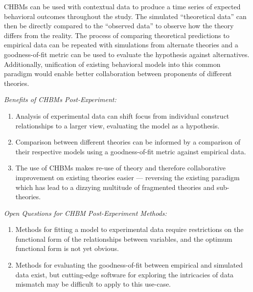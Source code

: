 \documentclass[runningheads,a4paper]{llncs}
\begin{document}
CHBMs can be used with contextual data to produce a time series of expected behavioral outcomes throughout the study.
The simulated ``theoretical data'' can then be directly compared to the ``observed data'' to observe how the theory differs from the reality.
The process of comparing theoretical predictions to empirical data can be repeated with simulations from alternate theories and a goodness-of-fit metric can be used to evaluate the hypothesis against alternatives.
Additionally, unification of existing behavioral models into this common paradigm would enable better collaboration between proponents of different theories.

\emph{Benefits of CHBMs Post-Experiment:}
\begin{enumerate}
    \item Analysis of experimental data can shift focus from individual construct relationships to a larger view, evaluating the model as a hypothesis.
    \item Comparison between different theories can be informed by a comparison of their respective models using a goodness-of-fit metric against empirical data.
    \item The use of CHBMs makes re-use of theory and therefore collaborative improvement on existing theories easier --- reversing the existing paradigm which has lead to a dizzying multitude of fragmented theories and sub-theories.
\end{enumerate}

\emph{Open Questions for CHBM Post-Experiment Methods:}
\begin{enumerate}
    \item Methods for fitting a model to experimental data require restrictions on the functional form of the relationships between variables, and the optimum functional form is not yet obvious.
    \item Methods for evaluating the goodness-of-fit between empirical and simulated data exist, but cutting-edge software for exploring the intricacies of data mismatch may be difficult to apply to this use-case.
\end{enumerate}
\end{document}
